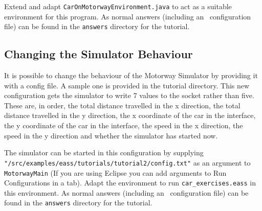 \documentclass[a4]{article}
\begin{document}
Extend and adapt \texttt{CarOnMotorwayEnvironment.java} to act as a suitable environment for this program.  As normal answers (including an \ail\ configuration file) can be found in the \texttt{answers} directory for the tutorial.

\subsection{Changing the Simulator Behaviour}
It is possible to change the behaviour of the Motorway Simulator by providing it with a config file.  A sample one is provided in the tutorial directory.  This new configuration gets the simulator to write 7 values to the socket rather than five.  These are, in order, the total distance travelled in the x direction, the total distance travelled in the y direction, the x coordinate of the car in the interface, the y coordinate of the car in the interface, the speed in the x direction, the speed in the y direction and whether the simulator has started now.

\begin{sloppypar}
The simulator can be started in this configuration by supplying \texttt{"/src/examples/eass/tutorials/tutorial2/config.txt"} as an argument to \texttt{MotorwayMain} (If you are using Eclipse you can add arguments to Run Configurations in a tab).  Adapt the environment to run \texttt{car\_exercises.eass} in this environment.  As normal answers (including an \ail\ configuration file) can be found in the \texttt{answers} directory for the tutorial.
\end{sloppypar}
\end{document}
